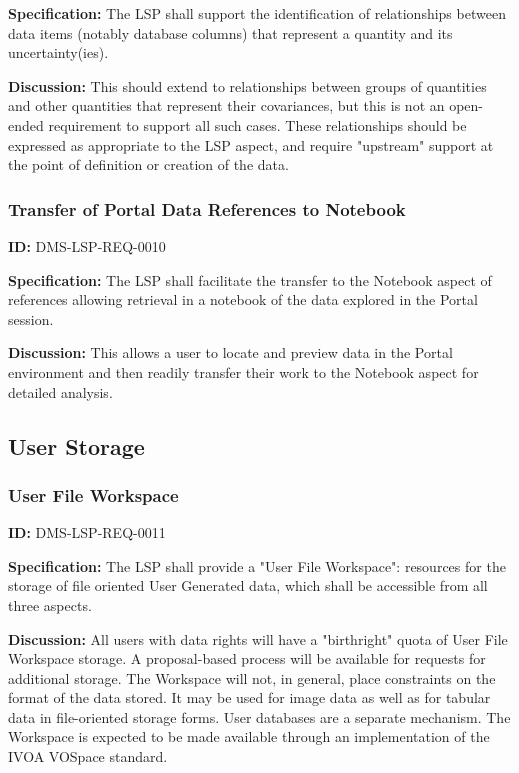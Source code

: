 \documentclass[SE,toc,lsstdraft]{lsstdoc}
\begin{document}
\textbf{Specification:}
The LSP shall support the identification of relationships between data items (notably database columns) that represent a quantity and its uncertainty(ies).

\textbf{Discussion:}
This should extend to relationships between groups of quantities and other quantities that represent their covariances, but this is not an open-ended requirement to support all such cases.
These relationships should be expressed as appropriate to the LSP aspect, and require "upstream" support at the point of definition or creation of the data.

\subsubsection{Transfer of Portal Data References to Notebook}

\label{DMS-LSP-REQ-0010}
\textbf{ID:} DMS-LSP-REQ-0010

\textbf{Specification:}
The LSP shall facilitate the transfer to the Notebook aspect of references allowing retrieval in a notebook of the data explored in the Portal session.

\textbf{Discussion:}
This allows a user to locate and preview data in the Portal environment and then readily transfer their work to the Notebook aspect for detailed analysis.

\subsection{User Storage}

\subsubsection{User File Workspace}

\label{DMS-LSP-REQ-0011}
\textbf{ID:} DMS-LSP-REQ-0011

\textbf{Specification:}
The LSP shall provide a "User File Workspace": resources for the storage of file oriented User Generated data, which shall be accessible from all three aspects.

\textbf{Discussion:}
All users with data rights will have a "birthright" quota of User File Workspace storage.  A proposal-based process will be available for requests for additional storage.  The Workspace will not, in general, place constraints on the format of the data stored.  It may be used for image data as well as for tabular data in file-oriented storage forms.  User databases are a separate mechanism.
The Workspace is expected to be made available through an implementation of the IVOA VOSpace standard.
\end{document}
